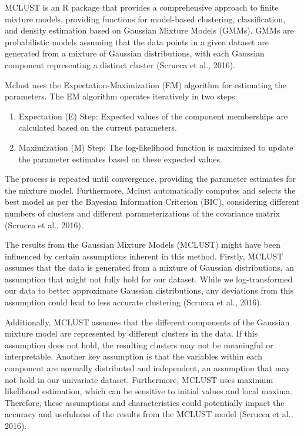 \documentclass[11pt, a4paper]{article}
\begin{document}
MCLUST is an R package that provides a comprehensive approach to finite mixture models, providing functions for model-based clustering, classification, and density estimation based on Gaussian Mixture Models (GMMs). GMMs are probabilistic models assuming that the data points in a given dataset are generated from a mixture of Gaussian distributions, with each Gaussian component representing a distinct cluster (Scrucca et al., 2016).
\par
Mclust uses the Expectation-Maximization (EM) algorithm for estimating the parameters. The EM algorithm operates iteratively in two steps:
\begin{enumerate}
\item Expectation (E) Step: Expected values of the component memberships are calculated based on the current parameters.
\item Maximization (M) Step: The log-likelihood function is maximized to update the parameter estimates based on these expected values.
\end{enumerate}
The process is repeated until convergence, providing the parameter estimates for the mixture model. Furthermore, Mclust automatically computes and selects the best model as per the Bayesian Information Criterion (BIC), considering different numbers of clusters and different parameterizations of the covariance matrix (Scrucca et al., 2016).
\par
The results from the Gaussian Mixture Models (MCLUST) might have been influenced by certain assumptions inherent in this method. Firstly, MCLUST assumes that the data is generated from a mixture of Gaussian distributions, an assumption that might not fully hold for our dataset. While we log-transformed our data to better approximate Gaussian distributions, any deviations from this assumption could lead to less accurate clustering (Scrucca et al., 2016).
\par
Additionally, MCLUST assumes that the different components of the Gaussian mixture model are represented by different clusters in the data. If this assumption does not hold, the resulting clusters may not be meaningful or interpretable. Another key assumption is that the variables within each component are normally distributed and independent, an assumption that may not hold in our univariate dataset. Furthermore, MCLUST uses maximum likelihood estimation, which can be sensitive to initial values and local maxima. Therefore, these assumptions and characteristics could potentially impact the accuracy and usefulness of the results from the MCLUST model (Scrucca et al., 2016).
\end{document}
